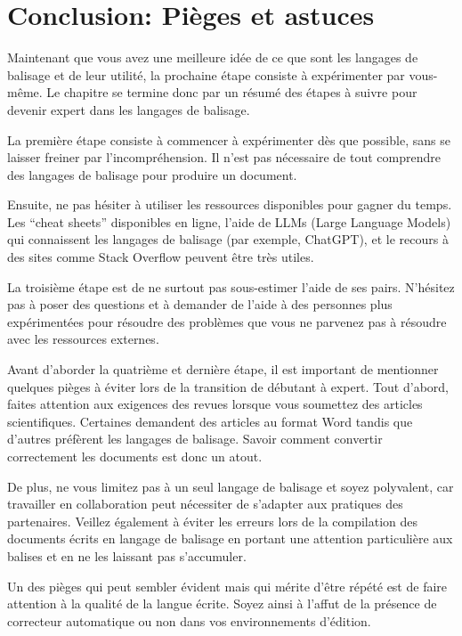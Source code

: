 \documentclass[
  letterpaper,
]{scrbook}
\begin{document}
\hypertarget{conclusion-piuxe8ges-et-astuces}{%
\section{Conclusion: Pièges et
astuces}\label{conclusion-piuxe8ges-et-astuces}}

Maintenant que vous avez une meilleure idée de ce que sont les langages
de balisage et de leur utilité, la prochaine étape consiste à
expérimenter par vous-même. Le chapitre se termine donc par un résumé
des étapes à suivre pour devenir expert dans les langages de balisage.

La première étape consiste à commencer à expérimenter dès que possible,
sans se laisser freiner par l'incompréhension. Il n'est pas nécessaire
de tout comprendre des langages de balisage pour produire un document.

Ensuite, ne pas hésiter à utiliser les ressources disponibles pour
gagner du temps. Les ``cheat sheets'' disponibles en ligne, l'aide de
LLMs (Large Language Models) qui connaissent les langages de balisage
(par exemple, ChatGPT), et le recours à des sites comme Stack Overflow
peuvent être très utiles.

La troisième étape est de ne surtout pas sous-estimer l'aide de ses
pairs. N'hésitez pas à poser des questions et à demander de l'aide à des
personnes plus expérimentées pour résoudre des problèmes que vous ne
parvenez pas à résoudre avec les ressources externes.

Avant d'aborder la quatrième et dernière étape, il est important de
mentionner quelques pièges à éviter lors de la transition de débutant à
expert. Tout d'abord, faites attention aux exigences des revues lorsque
vous soumettez des articles scientifiques. Certaines demandent des
articles au format Word tandis que d'autres préfèrent les langages de
balisage. Savoir comment convertir correctement les documents est donc
un atout.

De plus, ne vous limitez pas à un seul langage de balisage et soyez
polyvalent, car travailler en collaboration peut nécessiter de s'adapter
aux pratiques des partenaires. Veillez également à éviter les erreurs
lors de la compilation des documents écrits en langage de balisage en
portant une attention particulière aux balises et en ne les laissant pas
s'accumuler.

Un des pièges qui peut sembler évident mais qui mérite d'être répété est
de faire attention à la qualité de la langue écrite. Soyez ainsi à
l'affut de la présence de correcteur automatique ou non dans vos
environnements d'édition.
\end{document}
